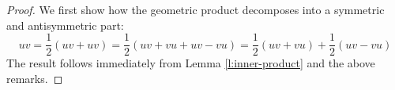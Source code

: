 \begin{proof}
	We first show how the geometric product decomposes into a symmetric and antisymmetric part:
	\[uv = \frac{1}{2}(uv + uv) = \frac{1}{2}(uv + vu + uv - vu) = \frac{1}{2}(uv + vu) + \frac{1}{2}(uv - vu)\]
	The result follows immediately from Lemma \ref{l:inner-product} and the above remarks.
\end{proof}
